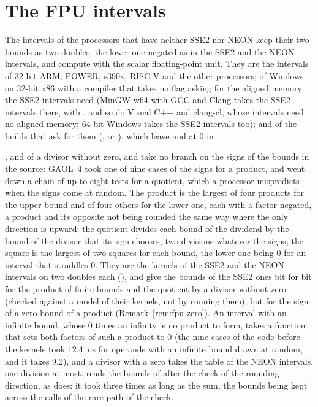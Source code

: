 \section{The FPU intervals}\label{sec:fpu-intervals}
%

The intervals of the processors that have neither SSE2 nor NEON keep their
two bounds as two doubles, the lower one negated as in the SSE2 and the NEON
intervals, and compute with the scalar floating-point unit. They are the
intervals of 32-bit ARM, POWER, s390x, RISC-V and the other processors; of
Windows on 32-bit x86 with a compiler that takes no flag asking for the
aligned memory the SSE2 intervals need (MinGW-w64 with GCC and Clang takes
the SSE2 intervals there, with , and so do Visual C++
and clang-cl, whose intervals need no aligned memory; 64-bit Windows takes
the SSE2 intervals too);
and of the builds that ask for them (,
 or ), which leave
 and
 at 0 in
.

\medskip
{},  and  of a divisor without zero, and
 take no branch on the signs of the bounds in the
source:\newinvfive{} GAOL~4 took one of nine cases of the signs for a
product, and went down a chain of up to eight tests for a quotient, which a
processor mispredicts when the signs come at random. The product is the
largest of four products for the upper bound and of four others for the lower
one, each with a factor negated, a product and its opposite not being rounded
the same way where the only direction is upward; the quotient divides each
bound of the dividend by the bound of the divisor that its sign chooses, two
divisions whatever the signs; the square is the largest of two squares for
each bound, the lower one being 0 for an interval that straddles 0. They are
the kernels of the SSE2 and the NEON intervals on two doubles each
(), and give the bounds of the SSE2 ones bit for bit for
the product of finite bounds and the quotient by a divisor without zero
(checked against a model of their kernels, not by running them), but for the
sign of a zero bound of a product (Remark~\ref{rem:fpu-zero}). An interval
with an infinite bound, whose 0 times an infinity is no product to form,
takes a function that sets both factors of such a product to 0 (the nine
cases of the code before the kernels took 12.4~ns for operands with an infinite bound drawn at
random, and it takes 9.2), and a divisor with a zero takes the table of the
NEON intervals, one division at most.  reads the bounds of
 after the check of the rounding direction, as  does: it
took three times as long as the sum, the bounds being kept across the calls
of the rare path of the check.

